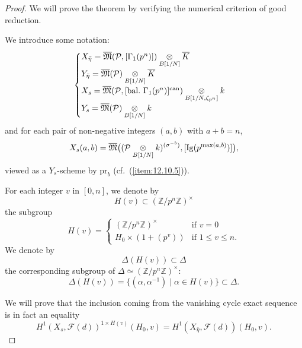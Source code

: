 \begin{proof}
We will prove the theorem by verifying the numerical criterion of good reduction.

We introduce some notation:
\begin{equation}\label{eq:14.5.1.1}
\begin{cases}
X_{\bar{\eta}} = \overline{\mathfrak{M}}(\mathcal{P}, [\Gamma_1(p^n)]) \tens{B[1/N]} \overline{K} \\[6pt]
Y_{\bar{\eta}} = \overline{\mathfrak{M}}(\mathcal{P}) \tens{B[1/N]} \overline{K} \\[6pt]
X_s = \overline{\mathfrak{M}}(\mathcal{P}, [\mathrm{bal.}\ \Gamma_1(p^n)]^{\mathrm{can}}) \tens{B[1/N, \zeta_{p^n}]} k \\[6pt]
Y_s = \overline{\mathfrak{M}}(\mathcal{P}) \tens{B[1/N]} k
\end{cases}
\end{equation}
and for each pair of non-negative integers $(a,b)$ with $a+b=n$,
\begin{equation}\label{eq:14.5.1.2}
X_s(a,b) = \overline{\mathfrak{M}}\bigl( (\mathcal{P} \underset{B[1/N]}{\otimes} k)^{(\sigma^{-b})}, [\mathrm{Ig}(p^{\max(a,b)})] \bigr) ,
\end{equation}
viewed as a $Y_s$-scheme by $\mathrm{pr}_b$ (cf.~(\ref{item:12.10.5})).

For each integer $v$ in $[0,n]$, we denote by
\[
H(v) \subset (\mathbb{Z}/p^n\mathbb{Z})^\times
\]
the subgroup
\begin{equation}\label{eq:14.5.1.3}
H(v) = \begin{cases}
(\mathbb{Z}/p^n\mathbb{Z})^\times & \text{if } v = 0 \\[4pt]
H_0 \times (1+(p^v)) & \text{if } 1 \le v \le n .
\end{cases}
\end{equation}
We denote by
\[
\Delta(H(v)) \subset \Delta
\]
the corresponding subgroup of $\Delta \simeq (\mathbb{Z}/p^n\mathbb{Z})^\times$:
\begin{equation}\label{eq:14.5.1.4}
\Delta(H(v)) = \{ (\alpha, \alpha^{-1}) \mid \alpha \in H(v) \} \subset \Delta .
\end{equation}

We will prove that the inclusion coming from the vanishing cycle exact sequence is in fact an equality
%
\begin{equation}\label{eq:14.5.2}\tag{\thekmitem}
H^1(X_s, \mathcal{F}(d))^{1 \times H(v)}(H_0, v) = H^1(X_{\bar{\eta}}, \mathcal{F}(d))(H_0, v) .
\end{equation}


\end{proof}
